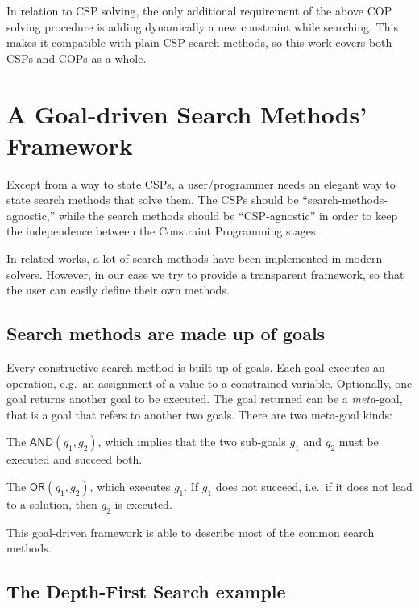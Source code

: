 \documentclass{ws-ijait}
\begin{document}
In relation to CSP solving, the only additional requirement
of the above COP solving procedure is adding dynamically a
new constraint while searching. This makes it compatible
with plain CSP search methods, so this work covers both CSPs
and COPs as a whole.


\section{A Goal-driven Search Methods'
         Framework\label{framework}}

Except from a way to state CSPs, a user\slash programmer
needs an elegant way to state search methods that solve
them. The CSPs should be ``search-methods-agnostic,'' while
the search methods should be ``CSP-agnostic'' in order to
keep the independence between the Constraint Programming
stages.

In related works, a lot of search methods have been
implemented in modern solvers.\cite{Gecode2017} However, in
our case we try to provide a transparent framework, so that
the user can easily define their own methods.

\subsection{Search methods are made up of goals}

Every constructive search method is built up of goals. Each
goal executes an operation, e.g.\ an assignment of a value
to a constrained variable. Optionally, one goal returns
another goal to be executed. The goal returned can be a
\emph{meta}-goal, that is a goal that refers to another two
goals. There are two meta-goal kinds:
\begin{romanlist}
  \item The $\mathsf{AND}(g_1,g_2)$, which implies that the
        two sub-goals $g_1$ and $g_2$ must be executed and
        succeed both.
  \item The $\mathsf{OR}(g_1,g_2)$, which executes $g_1$. If
        $g_1$ does not succeed, i.e.\ if it does not lead to
        a solution, then $g_2$ is executed.
\end{romanlist}
This goal-driven framework is able to describe most of the
common search methods.

\subsection{The Depth-First Search example}
\end{document}
